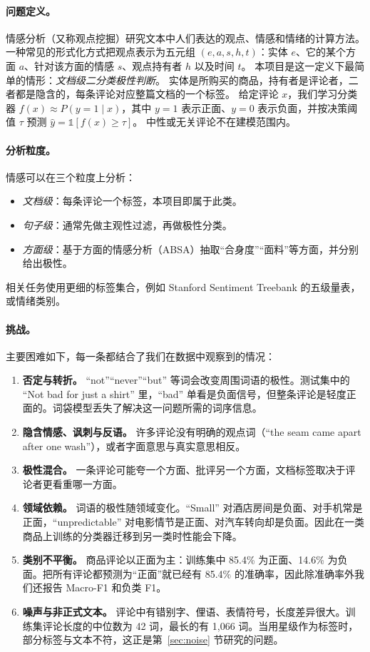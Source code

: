 \documentclass[11pt,a4paper]{article}
\begin{document}
\paragraph{问题定义。}
情感分析（又称观点挖掘）研究文本中人们表达的观点、情感和情绪的计算方法\cite{wankhade2022survey}。
一种常见的形式化方式把观点表示为五元组 $(e, a, s, h, t)$：实体 $e$、它的某个方面 $a$、针对该方面的情感 $s$、观点持有者 $h$ 以及时间 $t$。
本项目是这一定义下最简单的情形：\emph{文档级二分类极性判断}。
实体是所购买的商品，持有者是评论者，二者都是隐含的，每条评论对应整篇文档的一个标签。
给定评论 $x$，我们学习分类器 $f(x) \approx P(y{=}1 \mid x)$，其中 $y=1$ 表示正面、$y=0$ 表示负面，并按决策阈值 $\tau$ 预测 $\hat y = \mathbb{1}[f(x) \ge \tau]$。
中性或无关评论不在建模范围内。

\paragraph{分析粒度。}
情感可以在三个粒度上分析：
\begin{itemize}
  \item \emph{文档级}：每条评论一个标签，本项目即属于此类。
  \item \emph{句子级}：通常先做主观性过滤，再做极性分类。
  \item \emph{方面级}：基于方面的情感分析（ABSA）抽取``合身度''``面料''等方面，并分别给出极性\cite{zhang2023absa}。
\end{itemize}
相关任务使用更细的标签集合，例如 Stanford Sentiment Treebank 的五级量表，或情绪类别。

\paragraph{挑战。}
主要困难如下，每一条都结合了我们在数据中观察到的情况：
\begin{enumerate}
  \item \textbf{否定与转折。} ``not''``never''``but'' 等词会改变周围词语的极性。测试集中的 ``Not bad for just a shirt'' 里，``bad'' 单看是负面信号，但整条评论是轻度正面的。词袋模型丢失了解决这一问题所需的词序信息。
  \item \textbf{隐含情感、讽刺与反语。} 许多评论没有明确的观点词（``the seam came apart after one wash''），或者字面意思与真实意思相反。
  \item \textbf{极性混合。} 一条评论可能夸一个方面、批评另一个方面，文档标签取决于评论者更看重哪一方面。
  \item \textbf{领域依赖。} 词语的极性随领域变化。``Small'' 对酒店房间是负面、对手机常是正面，``unpredictable'' 对电影情节是正面、对汽车转向却是负面。因此在一类商品上训练的分类器迁移到另一类时性能会下降\cite{blitzer2007biographies}。
  \item \textbf{类别不平衡。} 商品评论以正面为主：训练集中 85.4\% 为正面、14.6\% 为负面。把所有评论都预测为``正面''就已经有 85.4\% 的准确率，因此除准确率外我们还报告 Macro-F1 和负类 F1。
  \item \textbf{噪声与非正式文本。} 评论中有错别字、俚语、表情符号，长度差异很大。训练集评论长度的中位数为 42 词，最长的有 1{,}066 词。当用星级作为标签时，部分标签与文本不符，这正是第~\ref{sec:noise} 节研究的问题。
\end{enumerate}
\end{document}
